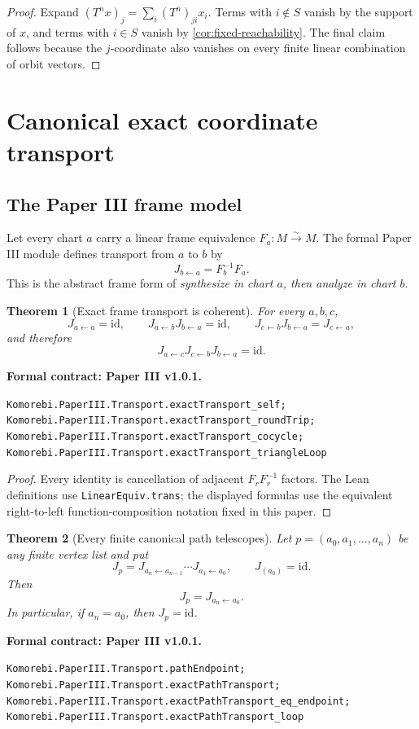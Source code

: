 \documentclass[11pt,a4paper]{article}
\newtheorem{theorem}{Theorem}[section]
\theoremstyle{plain}
\theoremstyle{definition}
\theoremstyle{remark}
\newcommand{\id}{\mathrm{id}}
\newcommand{\leanname}[1]{\nolinkurl{#1}}
\newcommand{\statusleanthree}[1]{\par\smallskip\noindent\begin{minipage}{\linewidth}{\color{leanblue}\textbf{Formal contract: Paper III v1.0.1.}}\par\begingroup\small\raggedright\leanname{#1}\par\endgroup\end{minipage}\par\smallskip}
\begin{document}
\begin{proof}
Expand $(T^nx)_j=\sum_i(T^n)_{ji}x_i$.  Terms with $i\notin S$ vanish by
the support of $x$, and terms with $i\in S$ vanish by
\cref{cor:fixed-reachability}.  The final claim follows because the
$j$-coordinate also vanishes on every finite linear combination of orbit
vectors.
\end{proof}

\section{Canonical exact coordinate transport}
\label{sec:canonical-transport}

\subsection{The Paper III frame model}

Let every chart $a$ carry a linear frame equivalence
$F_a:M\xrightarrow{\sim}M$.  The formal Paper III module defines transport
from $a$ to $b$ by
\[
J_{b\leftarrow a}=F_b^{-1}F_a.
\]
This is the abstract frame form of \emph{synthesize in chart \(a\), then
analyze in chart \(b\)}.

\begin{theorem}[Exact frame transport is coherent]
\label{thm:exact-frame-transport}
For every $a,b,c$,
\[
J_{a\leftarrow a}=\id,\qquad
J_{a\leftarrow b}J_{b\leftarrow a}=\id,\qquad
J_{c\leftarrow b}J_{b\leftarrow a}=J_{c\leftarrow a},
\]
and therefore
\[
J_{a\leftarrow c}J_{c\leftarrow b}J_{b\leftarrow a}=\id.
\]
\end{theorem}
\statusleanthree{Komorebi.PaperIII.Transport.exactTransport_self; Komorebi.PaperIII.Transport.exactTransport_roundTrip; Komorebi.PaperIII.Transport.exactTransport_cocycle; Komorebi.PaperIII.Transport.exactTransport_triangleLoop}

\begin{proof}
Every identity is cancellation of adjacent $F_rF_r^{-1}$ factors.  The Lean
definitions use \leanname{LinearEquiv.trans}; the displayed formulas use the
equivalent right-to-left function-composition notation fixed in this paper.
\end{proof}

\begin{theorem}[Every finite canonical path telescopes]
\label{thm:exact-path-transport}
Let $p=(a_0,a_1,\ldots,a_n)$ be any finite vertex list and put
\[
J_p
=J_{a_n\leftarrow a_{n-1}}\cdots J_{a_1\leftarrow a_0},
\qquad
J_{(a_0)}=\id.
\]
Then
\[
J_p=J_{a_n\leftarrow a_0}.
\]
In particular, if $a_n=a_0$, then $J_p=\id$.
\end{theorem}
\statusleanthree{Komorebi.PaperIII.Transport.pathEndpoint; Komorebi.PaperIII.Transport.exactPathTransport; Komorebi.PaperIII.Transport.exactPathTransport_eq_endpoint; Komorebi.PaperIII.Transport.exactPathTransport_loop}
\end{document}
